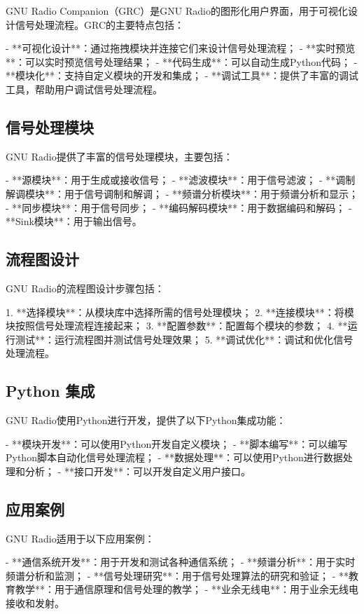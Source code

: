 ﻿\documentclass[UTF8]{ctexbook}
\begin{document}
GNU Radio Companion（GRC）是GNU Radio的图形化用户界面，用于可视化设计信号处理流程。GRC的主要特点包括：

- **可视化设计**：通过拖拽模块并连接它们来设计信号处理流程；
- **实时预览**：可以实时预览信号处理结果；
- **代码生成**：可以自动生成Python代码；
- **模块化**：支持自定义模块的开发和集成；
- **调试工具**：提供了丰富的调试工具，帮助用户调试信号处理流程。

\subsection{信号处理模块}

GNU Radio提供了丰富的信号处理模块，主要包括：

- **源模块**：用于生成或接收信号；
- **滤波模块**：用于信号滤波；
- **调制解调模块**：用于信号调制和解调；
- **频谱分析模块**：用于频谱分析和显示；
- **同步模块**：用于信号同步；
- **编码解码模块**：用于数据编码和解码；
- **Sink模块**：用于输出信号。

\subsection{流程图设计}

GNU Radio的流程图设计步骤包括：

1. **选择模块**：从模块库中选择所需的信号处理模块；
2. **连接模块**：将模块按照信号处理流程连接起来；
3. **配置参数**：配置每个模块的参数；
4. **运行测试**：运行流程图并测试信号处理效果；
5. **调试优化**：调试和优化信号处理流程。

\subsection{Python 集成}

GNU Radio使用Python进行开发，提供了以下Python集成功能：

- **模块开发**：可以使用Python开发自定义模块；
- **脚本编写**：可以编写Python脚本自动化信号处理流程；
- **数据处理**：可以使用Python进行数据处理和分析；
- **接口开发**：可以开发自定义用户接口。

\subsection{应用案例}

GNU Radio适用于以下应用案例：

- **通信系统开发**：用于开发和测试各种通信系统；
- **频谱分析**：用于实时频谱分析和监测；
- **信号处理研究**：用于信号处理算法的研究和验证；
- **教育教学**：用于通信原理和信号处理的教学；
- **业余无线电**：用于业余无线电接收和发射。
\end{document}
